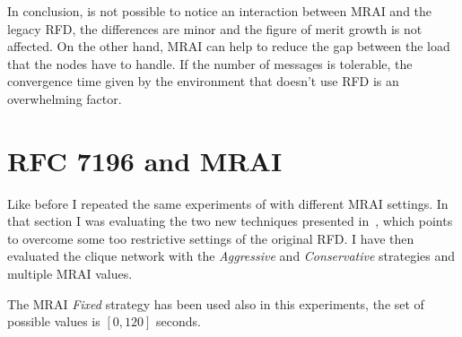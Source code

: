 In conclusion, is not possible to notice an interaction between \ac{MRAI} and the legacy
\ac{RFD}, the differences are minor and the figure of merit growth is not
affected.
On the other hand, \ac{MRAI} can help to reduce the gap between the load that
the nodes have to handle.
If the number of messages is tolerable, the convergence time given by the
environment that doesn't use \ac{RFD} is an overwhelming factor.


\section{RFC 7196 and MRAI}
\label{sec:bgp_rfd_comparison}

%
%

Like before I repeated the same experiments of  with
different \ac{MRAI} settings.
In that section I was evaluating the two new techniques presented in~\cite{rfc7196},
which points to overcome some too restrictive settings of the original \ac{RFD}.
I have then evaluated the clique network with the \textit{Aggressive} and
\textit{Conservative} strategies and multiple \ac{MRAI} values.

The \ac{MRAI} \textit{Fixed} strategy has been used also in this experiments,
the set of possible values is \([0, 120]\) seconds.

